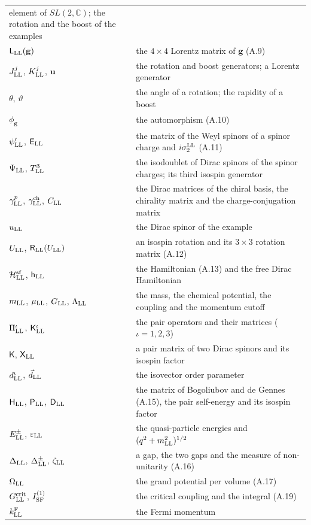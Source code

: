 \documentclass[
  10pt,
]{article}
\begin{document}
\begin{longtable}[]{@{}
  >{\raggedright\arraybackslash}p{}
  >{\raggedright\arraybackslash}p{}@{}}
element of \(SL(2,\mathbb C)\); the rotation and the boost of the
examples \\
\(\mathsf L_{\rm LL}(\mathbf g)\) & the \(4\times4\) Lorentz matrix of
\(\mathbf g\) (A.9) \\
\(J^j_{\rm LL}\), \(K^j_{\rm LL}\), \(\mathbf u\) & the rotation and
boost generators; a Lorentz generator \\
\(\theta\), \(\vartheta\) & the angle of a rotation; the rapidity of a
boost \\
\(\phi_{\mathbf g}\) & the automorphism (A.10) \\
\(\psi'_{\rm LL}\), \(\mathsf E_{\rm LL}\) & the matrix of the Weyl
spinors of a spinor charge and \(i\sigma^{\rm LL}_2\) (A.11) \\
\(\Psi_{\rm LL}\), \(T^3_{\rm LL}\) & the isodoublet of Dirac spinors of
the spinor charges; its third isospin generator \\
\(\gamma^p_{\rm LL}\), \(\gamma^{\rm ch}_{\rm LL}\), \(C_{\rm LL}\) &
the Dirac matrices of the chiral basis, the chirality matrix and the
charge-conjugation matrix \\
\(u_{\rm LL}\) & the Dirac spinor of the example \\
\(U_{\rm LL}\), \(\mathsf R_{\rm LL}(U_{\rm LL})\) & an isospin rotation
and its \(3\times3\) rotation matrix (A.12) \\
\(\mathcal H^{\rm sf}_{\rm LL}\), \(\mathsf h_{\rm LL}\) & the
Hamiltonian (A.13) and the free Dirac Hamiltonian \\
\(m_{\rm LL}\), \(\mu_{\rm LL}\), \(G_{\rm LL}\), \(\Lambda_{\rm LL}\) &
the mass, the chemical potential, the coupling and the momentum
cutoff \\
\(\Pi^\iota_{\rm LL}\), \(\mathsf K^\iota_{\rm LL}\) & the pair
operators and their matrices (\(\iota=1,2,3\)) \\
\(\mathsf K\), \(\mathsf X_{\rm LL}\) & a pair matrix of two Dirac
spinors and its isospin factor \\
\(d^\iota_{\rm LL}\), \(\vec d_{\rm LL}\) & the isovector order
parameter \\
\(\mathsf H_{\rm LL}\), \(\mathsf P_{\rm LL}\), \(\mathsf D_{\rm LL}\) &
the matrix of Bogoliubov and de Gennes (A.15), the pair self-energy and
its isospin factor \\
\(E^\pm_{\rm LL}\), \(\varepsilon_{\rm LL}\) & the quasi-particle
energies and \((q^2+m_{\rm LL}^2)^{1/2}\) \\
\(\Delta_{\rm LL}\), \(\Delta^\pm_{\rm LL}\), \(\zeta_{\rm LL}\) & a
gap, the two gaps and the measure of non-unitarity (A.16) \\
\(\Omega_{\rm LL}\) & the grand potential per volume (A.17) \\
\(G^{\rm crit}_{\rm LL}\), \(I^{(1)}_{\rm SF}\) & the critical coupling
and the integral (A.19) \\
\(k^{\rm F}_{\rm LL}\) & the Fermi momentum \\
\end{longtable}
\end{document}
